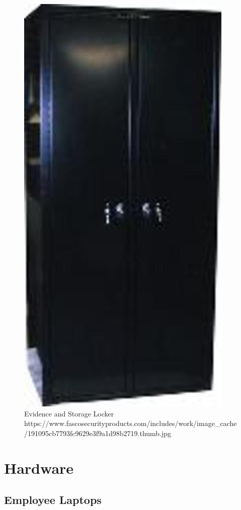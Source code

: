 \documentclass[12pt]{article}
\begin{document}
\begin{figure}[H]
   \centering
   	\captionsetup{justification=centering}
       \includegraphics{figures/locker.jpg}
 \caption{Evidence and Storage Locker https://www.fascosecurityproducts.com/includes/work/image\_cache/191095cb7793fc9629e3f9a1d98b2719.thumb.jpg}
 \label{fig:Locker}
\end{figure}

\section{Hardware}

\subsection{Employee Laptops} 
\end{document}
